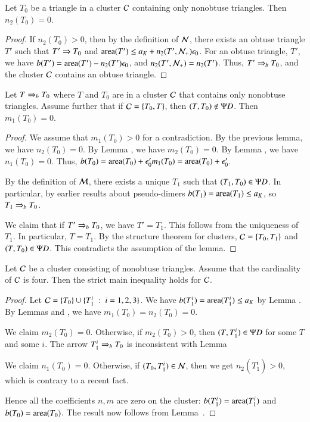 \begin{lemma} Let $T_0$ be a triangle 
 in a cluster $\mathcal C$ containing only nonobtuse triangles.  Then
$n_2(T_0)=0$.
\end{lemma}

\begin{proof}  If $n_2(T_0)>0$, then by the definition of $\mathcal N$,
there exists an obtuse triangle
$T'$ such that $T'\Rightarrow T_0$ and 
${\operatorname{area}}(T') \le a_K+  n_2(T',\mathcal N_+)\epsilon_0$.  For an obtuse triangle,
$T'$, we have $b(T') = {\operatorname{area}}(T') - n_2(T')\epsilon_0$, and $n_2(T',\mathcal N_+)=n_2(T')$.
Thus, $T'\Rightarrow_{b} T_0$, and the cluster $\mathcal C$ contains an obtuse triangle.
\end{proof}

\begin{lemma}  Let $T\Rightarrow_{b} T_0$ where $T$ and $T_0$ are in a cluster $\mathcal C$
that contains only nonobtuse triangles.  Assume further that if
$\mathcal C=\{T_0,T\}$, then $(T,T_0)\not\in\Psi D$.
Then $m_1(T_0)=0$.
\end{lemma}

\begin{proof}  We assume that $m_1(T_0)>0$ for a contradiction.
By the previous lemma, we have $n_2(T_0)=0$.  By Lemma ,
we have $m_2(T_0)=0$.  By Lemma , we have $n_1(T_0)=0$.
Thus, $b(T_0) = {\operatorname{area}}(T_0) + \epsilon_0' m_1(T_0) = {\operatorname{area}}(T_0)+\epsilon_0'$.

By the definition of $\mathcal M$, there exists a unique $T_1$ such that $(T_1,T_0)\in \Psi D$.
In particular, by earlier results about pseudo-dimers $b(T_1)={\operatorname{area}}(T_1)\le a_K$, so $T_1\Rightarrow_{b} T_0$.

We claim that if $T'\Rightarrow_{b} T_0$, we have $T'=T_1$.  This follows from the uniqueness of $T_1$.
In particular, $T=T_1$.
By the structure theorem for clusters, $\mathcal C = \{T_0,T_1\}$ and $(T,T_0)\in\Psi D$.
This contradicts the assumption of the lemma.
\end{proof}

\begin{lemma}
Let $\mathcal C$ be a cluster consisting of nonobtuse triangles.  Assume
that the cardinality of $\mathcal C$ is four. 
Then the strict main inequality holds for $\mathcal C$.
\end{lemma}

\begin{proof}  Let $\mathcal C = \{T_0\}\cup \{T_1^i \ :\  i=1,2,3\}$.  
We have $b(T^i_1) = {\operatorname{area}}(T^i_1)\le a_K$ by Lemma .
By Lemmas  and , we have $m_1(T_0)=n_2(T_0)=0$.

We claim $m_2(T_0)=0$.  Otherwise,
if $m_2(T_0) >0$, then  $(T,T^i_1)\in\Psi D$ for some $T$ and some $i$.
The arrow $T^i_1\Rightarrow_{b} T_0$ is inconsistent with Lemma 

We claim $n_1(T_0)=0$.  Otherwise, if $(T_0,T^i_1)\in\mathcal N$, then we get $n_2(T^i_1)>0$,
which is contrary to a recent fact.

Hence all the coefficients $n,m$ are zero on the cluster: $b(T^i_1)={\operatorname{area}}(T^i_1)$ and
$b(T_0) = {\operatorname{area}}(T_0)$.
The result now follows from Lemma~.
\end{proof}

